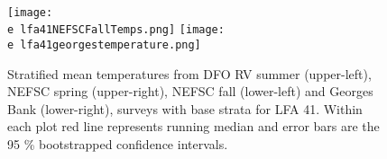 \documentclass[11pt]{article}
\newcommand{\e}{/backup/bio_data/bio.lobster/figures/} %
\begin{document}

\begin{figure}

  \\
    \texttt{[image: \\e lfa41NEFSCFallTemps.png]}
    \texttt{[image: \\e lfa41georgestemperature.png]}\\
   
    \caption{Stratified mean temperatures from DFO RV summer (upper-left), NEFSC spring (upper-right), NEFSC fall (lower-left) and Georges Bank (lower-right), surveys with base strata for LFA 41. Within each plot red line represents running median and error bars are the 95 \% bootstrapped confidence intervals.}

\end{figure}
\end{document}
